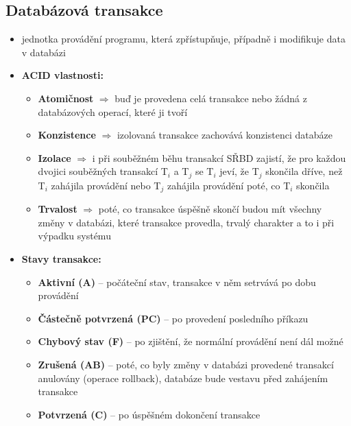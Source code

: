 \documentclass[a4paper,10pt]{article}
\newcommand{\pojem}[2]{\item \textbf{#1:}\quad #2}
\begin{document}
		\subsection{Databázová transakce}
			\begin{itemize}
				\item jednotka provádění programu, která zpřístupňuje, případně i modifikuje data v databázi

				\pojem{ACID vlastnosti}
				\begin{itemize}
					\item \textbf{Atomičnost} $\Rightarrow$ buď je provedena celá transakce nebo žádná z databázových operací, které ji tvoří
					\item \textbf{Konzistence} $\Rightarrow$ izolovaná transakce zachovává konzistenci databáze
					\item \textbf{Izolace} $\Rightarrow$ i při souběžném běhu transakcí SŘBD zajistí, že pro každou dvojici souběžných transakcí T$_i$ a T$_j$ se T$_i$ jeví, že T$_j$ skončila dříve, než T$_i$ zahájila provádění nebo T$_j$ zahájila provádění poté, co T$_i$ skončila
					\item \textbf{Trvalost} $\Rightarrow$ poté, co transakce úspěšně skončí budou mít všechny změny v databázi, které transakce provedla, trvalý charakter a to i při výpadku systému
				\end{itemize}
				\pagebreak

				\pojem{Stavy transakce}
				\begin{figure}[h!]
					\centering
				\end{figure}
				
				\begin{itemize}
					\item \textbf{Aktivní (A)} -- počáteční stav, transakce v něm setrvává po dobu provádění
					\item \textbf{Částečně potvrzená (PC)} -- po provedení posledního příkazu
					\item \textbf{Chybový stav (F)} -- po zjištění, že normální provádění není dál možné
					\item \textbf{Zrušená (AB)} -- poté, co byly změny v databázi provedené transakcí anulovány (operace rollback), databáze bude vestavu před zahájením transakce
					\item \textbf{Potvrzená (C)} -- po úspěšném dokončení transakce
				\end{itemize}
			\end{itemize}
\end{document}
